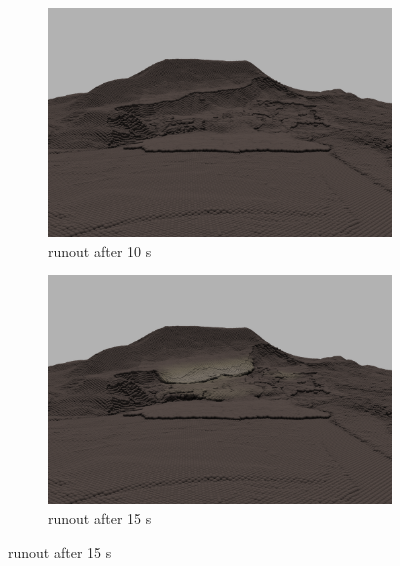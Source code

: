 \documentclass[journal]{IEEEtran}
\begin{document}
 
 \begin{figure}[!tbp]
    \begin{subfigure}[b]{0.333\textwidth}
        \includegraphics[width=\textwidth]{figs/tstep-010000_00000.png}
        \caption{runout after 10 s}
    \end{subfigure}
    \begin{subfigure}[b]{0.334\textwidth}
        \includegraphics[width=\textwidth]{figs/tstep-015000_00000.png}
        \caption{runout after 15 s}

\end{subfigure}
\end{figure}
\end{document}
